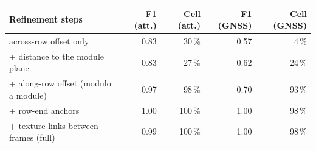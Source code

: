 \begin{tabular}{lrrrr}
\toprule
Refinement steps & F1 (att.) & Cell (att.) & F1 (GNSS) & Cell (GNSS) \\
\midrule
across-row offset only & 0.83 & 30\,\% & 0.57 & 4\,\% \\
+ distance to the module plane & 0.83 & 27\,\% & 0.62 & 24\,\% \\
+ along-row offset (modulo a module) & 0.97 & 98\,\% & 0.70 & 93\,\% \\
+ row-end anchors & 1.00 & 100\,\% & 1.00 & 98\,\% \\
+ texture links between frames (full) & 0.99 & 100\,\% & 1.00 & 98\,\% \\
\bottomrule
\end{tabular}
